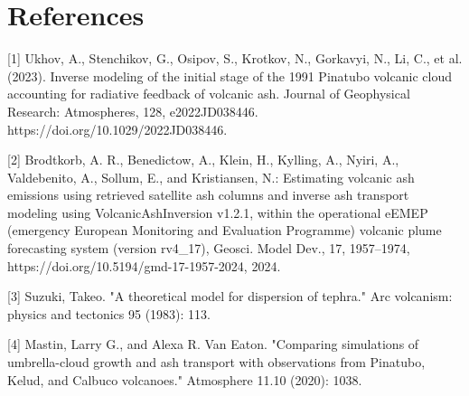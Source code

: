 \documentclass{article}
\begin{document}
\clearpage
\section{References}
[1] Ukhov, A., Stenchikov, G., Osipov, S., Krotkov, N., Gorkavyi, N., Li, C., et al. (2023). Inverse modeling of the initial stage of the 1991 Pinatubo volcanic cloud accounting for radiative feedback of volcanic ash. Journal of Geophysical Research: Atmospheres, 128, e2022JD038446. https://doi.org/10.1029/2022JD038446.

[2] Brodtkorb, A. R., Benedictow, A., Klein, H., Kylling, A., Nyiri, A., Valdebenito, A., Sollum, E., and Kristiansen, N.: Estimating volcanic ash emissions using retrieved satellite ash columns and inverse ash transport modeling using VolcanicAshInversion v1.2.1, within the operational eEMEP (emergency European Monitoring and Evaluation Programme) volcanic plume forecasting system (version rv4_17), Geosci. Model Dev., 17, 1957–1974, https://doi.org/10.5194/gmd-17-1957-2024, 2024.

[3] Suzuki, Takeo. "A theoretical model for dispersion of tephra." Arc volcanism: physics and tectonics 95 (1983): 113.

[4] Mastin, Larry G., and Alexa R. Van Eaton. "Comparing simulations of umbrella-cloud growth and ash transport with observations from Pinatubo, Kelud, and Calbuco volcanoes." Atmosphere 11.10 (2020): 1038.
\end{document}
